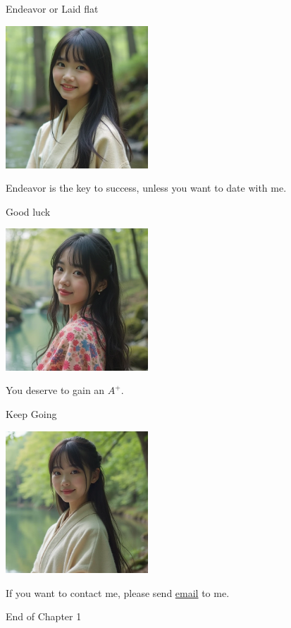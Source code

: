 \documentclass{beamer}
\begin{document}
\begin{frame}{Endeavor or Laid flat}
\begin{center}
\includegraphics[width=0.4\textwidth]{fail.png}
\end{center}
\begin{center}
Endeavor is the key to success, unless you want to date with me.
\end{center}
\end{frame}
\begin{frame}{Good luck}
\begin{center}
\includegraphics[width=0.4\textwidth]{good_luck.png}
\end{center}
\begin{center}
You deserve to gain an $A^+$.
\end{center}
\end{frame}
\begin{frame}{Keep Going}
\begin{center}
\includegraphics[width=0.4\textwidth]{kg.png}
\end{center}
\begin{center}
If you want to contact me, please send \href{mailto:politics-tchsiao@gmail.com}{email} to me.
\end{center}
\end{frame}
\begin{frame}{}
\begin{center}
\Large{End of Chapter 1}
\end{center}
\end{frame}
\end{document}
